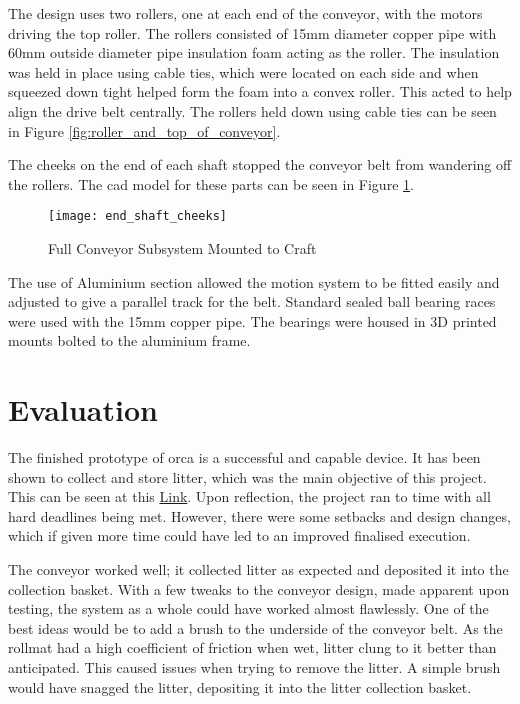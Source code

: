 \documentclass [12pt]{article}
\begin{document}
The design uses two rollers, one at each end of the conveyor, with the motors driving the top roller.
The rollers consisted of 15mm diameter copper pipe with 60mm outside diameter pipe insulation foam acting as the roller. The insulation was held in place using cable ties, which were located on each side and when squeezed down tight helped form the foam into a convex roller. This acted to help align the drive belt centrally. The rollers held down using cable ties can be seen in Figure \ref{fig:roller_and_top_of_conveyor}.

The cheeks on the end of each shaft stopped the conveyor belt from wandering off the rollers. The \gls{cad} model for these parts can be seen in Figure \ref{fig:end_shaft_cheeks}.

\begin{figure}[H]
\centerline{\texttt{[image: end\_shaft\_cheeks]}}
\caption{Full Conveyor Subsystem Mounted to Craft}
\label{fig:end_shaft_cheeks}
\end{figure}

The use of Aluminium section allowed the motion system to be fitted easily and adjusted to give a parallel track for the belt.
Standard sealed ball bearing races were used with the 15mm copper pipe. The bearings were housed in 3D printed mounts bolted to the aluminium frame.

\section{Evaluation}

The finished prototype of \gls{orca} is a successful and capable device. It has been shown to collect and store litter, which was the main objective of this project. This can be seen at this \href{https://youtu.be/qdm5BroUwCk}{Link}. Upon reflection, the project ran to time with all hard deadlines being met. However, there were some setbacks and design changes, which if given more time could have led to an improved finalised execution. 

The conveyor worked well; it collected litter as expected and deposited it into the collection basket.  With a few tweaks to the conveyor design, made apparent upon testing, the system as a whole could have worked almost flawlessly. One of the best ideas would be to add a brush to the underside of the conveyor belt. As the \gls{rollmat} had a high coefficient of friction when wet, litter clung to it better than anticipated. This caused issues when trying to remove the litter. A simple brush would have snagged the litter, depositing it into the litter collection basket. 
\end{document}
